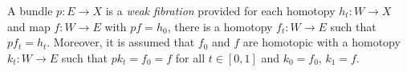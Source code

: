 A bundle $p \colon E \to X$ is a \textit{weak fibration} provided for each homotopy $h_t \colon W \to X$ and map $f \colon W \to E$ with $p f = h_0$, there is a homotopy $f_t \colon W \to E$ such that $p f_t = h_t$. Moreover, it is assumed that $f_0$ and $f$ are homotopic with a homotopy $k_t \colon W \to E$ such that $p k_t = f_0 = f$ for all $t \in [0,1]$ and $k_0 = f_0$, $k_1 = f$.
